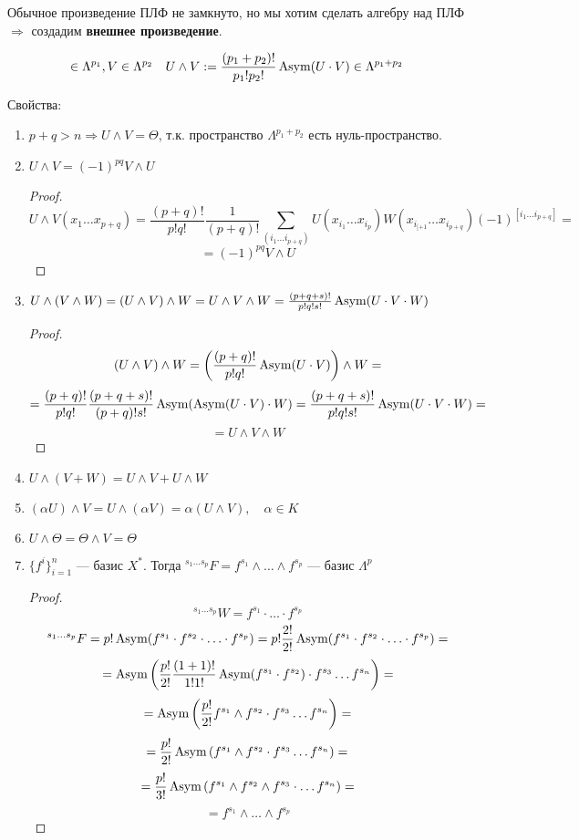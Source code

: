Обычное произведение ПЛФ не замкнуто, но мы хотим сделать алгебру над ПЛФ \(\Rightarrow\) создадим \textbf{внешнее произведение}.

\[\in \Lambda^{p_1}, V\in \Lambda^{p_2} \quad U\wedge V := \frac{(p_1+p_2)!}{p_1!p_2!} \operatorname{\text{Asym}} (U\cdot V) \in \Lambda^{p_1+p_2}\]

Свойства:
\begin{enumerate}
    \item $p+q>n\Rightarrow U\wedge V=\Theta$, т.к. пространство \(\Lambda^{p_1+p_2}\) есть нуль-пространство.
    \item $U\wedge V=(-1)^{pq} V\wedge U$
    \begin{proof}
        \[U\wedge V(x_1\ldots x_{p+q})=\frac{(p+q)!}{p!q!}\frac{1}{(p+q)!}\sum\limits_{(i_1\ldots i_{p+q})} U(x_{i_1}\ldots x_{i_p}) W(x_{i_{[+1}}\ldots x_{i_{p+q}})(-1)^{[i_1\ldots i_{p+q}]}=\]\[=(-1)^{pq} V\wedge U\]
    \end{proof}
    \item $U\wedge (V\wedge W)=(U\wedge V)\wedge W=U\wedge V\wedge W=\frac{(p+q+s)!}{p!q!s!}\operatorname{\text{Asym}}(U\cdot V\cdot W)$
    \begin{proof}
        \[(U\wedge V)\wedge W=\left(\frac{(p+q)!}{p!q!}\operatorname{\text{Asym}} (U\cdot V)\right)\wedge W=\]
        \[=\frac{(p+q)!}{p!q!}\frac{(p+q+s)!}{(p+q)!s!} \operatorname{\text{Asym}}(\operatorname{\text{Asym}}(U\cdot V)\cdot W)=\frac{(p+q+s)!}{p!q!s!}\operatorname{\text{Asym}}(U\cdot V\cdot W)=\]
        \[=U\wedge V\wedge W\]
    \end{proof}
    \item $U\wedge (V+W)=U\wedge V + U\wedge W$
    \item $(\alpha U)\wedge V=U\wedge (\alpha V)=\alpha(U\wedge V),\quad \alpha\in K$
    \item $U\wedge\Theta=\Theta\wedge V=\Theta$
    \item $\{f^i\}_{i=1}^n$ --- базис $X^*$. Тогда \({}^{s_1\ldots s_p}F=f^{s_1}\wedge\ldots\wedge f^{s_p}\) --- базис \(\Lambda^p\)
    \begin{proof}
        \[{}^{s_1\ldots s_p} W=f^{s_1}\cdot \ldots \cdot f^{s_p}\]
        \[{}^{s_1\ldots s_p} F=p!\operatorname{\text{Asym}}(f^{s_1}\cdot f^{s_2} \cdot \ldots \cdot f^{s_p})=p!\frac{2!}{2!} \operatorname{\text{Asym}}(f^{s_1}\cdot f^{s_2} \cdot \ldots \cdot f^{s_p})=\]
        \[=\operatorname{\text{Asym}}\left(\frac{p!}{2!}\frac{(1+1)!}{1!1!}\operatorname{\text{Asym}}(f^{s_1}\cdot f^{s_2}) \cdot f^{s_3}\ldots f^{s_n}\right)=\]
        \[=\operatorname{\text{Asym}}\left(\frac{p!}{2!} f^{s_1}\wedge f^{s_2} \cdot f^{s_3}\ldots f^{s_n}\right)=\]
        \[=\frac{p!}{2!}\operatorname{\text{Asym}}\left( f^{s_1}\wedge f^{s_2} \cdot f^{s_3}\ldots f^{s_n}\right)=\]
        \[=\frac{p!}{3!}\operatorname{\text{Asym}}\left( f^{s_1}\wedge f^{s_2} \wedge f^{s_3}\cdot \ldots f^{s_n}\right)=\]
        \[=f^{s_1}\wedge\ldots\wedge f^{s_p}\]
    \end{proof}
\end{enumerate}


